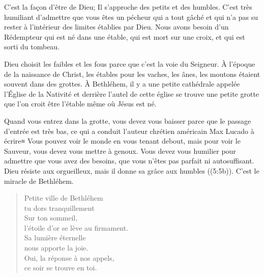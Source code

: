 C'est la façon d'être de Dieu; Il s'approche des petits et des humbles. C'est très humiliant d'admettre que vous êtes un pécheur qui a tout gâché et qui n'a pas su rester à l'intérieur des limites établies par Dieu. Nous avons besoin d'un Rédempteur qui est né dans une étable, qui est mort sur une croix, et qui est sorti du tombeau.

Dieu choisit les faibles et les fous parce que c'est la voie du Seigneur. À l'époque de la naissance de Christ, les étables pour les vaches, les ânes, les moutons étaient souvent dans des grottes. À Bethléhem, il y a une petite cathédrale appelée l'Église de la Nativité et derrière l'autel de cette église se trouve une petite grotte que l'on croit être l'étable même où Jésus est né.

Quand vous entrez dans la grotte, vous devez vous baisser parce que le passage d'entrée est très bas, ce qui a conduit l'auteur chrétien américain Max Lucado à écrire≡ \og Vous pouvez voir le monde en vous tenant debout, mais pour voir le Sauveur, vous devez vous mettre à genoux. Vous devez vous humilier pour admettre que vous avez des besoins, que vous n'êtes pas parfait ni autosuffisant. \fg{} \og Dieu résiste aux orgueilleux, mais il donne sa grâce aux humbles \fg{} ((5:5b)). C'est le miracle de Bethléhem.


\ornrule

\begin{verse}
Petite ville de Bethléhem\\
tu dors tranquillement\\
Sur ton sommeil,\\
l'étoile d'or se lève au firmament.\\
Sa lumière éternelle\\
nous apporte la joie.\\
Oui, la réponse à nos appels,\\
ce soir se trouve en toi.
\end{verse}
